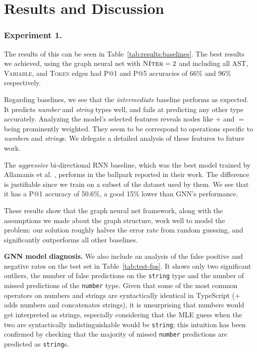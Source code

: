 \section{Results and Discussion}
\label{sec:results}
\subsubsection{Experiment 1.}
The results of this can be seen in Table~\ref{tab:results:baselines}.
The best results we achieved, using the graph neural net with $\textsc{NIter}=2$ and including all AST, \textsc{Variable}, and \textsc{Token} edges had P@1 and P@5 accuracies of 66\% and 96\% respectively.

Regarding baselines, we see that the \textit{intermediate} baseline performs as expected. It predicts \textit{number} and \textit{string} types well, and fails at predicting any other type accurately. Analyzing the model's selected features reveals nodes like $+$ and $=$ being prominently weighted. They seem to be correspond to operations specific to \textit{number}s and \textit{string}s. We delegate a detailed analysis of these features to future work. 

The \textit{aggressive} bi-directional RNN baseline, which was the best model trained by Allamanis et al. \cite{hellendoorn2018deep}, performs in the ballpark reported in their work. The difference is justifiable since we train on a subset of the dataset used by them. We see that it has a P@1 accuracy of 50.6\%, a good 15\% lower than GNN's performance.

These results show that the graph neural net framework, along with the assumptions we made about the graph structure, work well to model the problem: our solution roughly halves the error rate from random guessing, and significantly outperforms all other baselines.

\textbf{GNN model diagnosis.} We also include an analysis of the false positive and negative rates on the test set in Table~\ref{tab:test-fps}. It shows only two significant outliers, the number of false predictions on the \texttt{string} type and the number of missed predictions of the \texttt{number} type. 
Given that some of the most common operators on numbers and strings are syntactically identical in TypeScript ($+$ adds numbers and concatenates strings), it is unsurprising that numbers would get interpreted as strings, especially considering that the MLE guess when the two are syntactically indistinguishable would be \texttt{string}; this intuition has been confirmed by checking that the majority of missed \texttt{number} predictions are predicted as \texttt{string}s.

